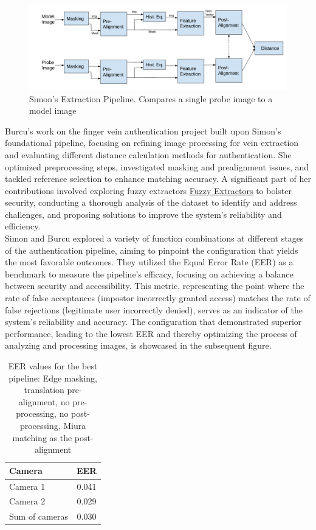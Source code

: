 \begin{figure}[!h]
    \centering
    \includegraphics[width=1\linewidth]{latex-img/pipeline_simon.png}
    \caption{Simon's Extraction Pipeline. Compares a single probe image to a model image}
    \label{pipeline_simon}
\end{figure}

Burcu's work on the finger vein authentication project built upon Simon's foundational pipeline, focusing on refining image processing for vein extraction and evaluating different distance calculation methods for authentication. She optimized preprocessing steps, investigated masking and prealignment issues, and tackled reference selection to enhance matching accuracy. A significant part of her contributions involved exploring fuzzy extractors \hyperref[def:Fuzzy_Extractors]{Fuzzy Extractors} to bolster security, conducting a thorough analysis of the dataset to identify and address challenges, and proposing solutions to improve the system's reliability and efficiency.\\

Simon and Burcu explored a variety of function combinations at different stages of the authentication pipeline, aiming to pinpoint the configuration that yields the most favorable outcomes. They utilized the Equal Error Rate (EER) as a benchmark to measure the pipeline's efficacy, focusing on achieving a balance between security and accessibility. This metric, representing the point where the rate of false acceptances (impostor incorrectly granted access) matches the rate of false rejections (legitimate user incorrectly denied), serves as an indicator of the system's reliability and accuracy. The configuration that demonstrated superior performance, leading to the lowest EER and thereby optimizing the process of analyzing and processing images, is showcased in the subsequent figure.

\begin{table}[H]
    \centering
    \caption{EER values for the best pipeline: Edge masking, translation pre-alignment, no pre-processing, no post-
    processing, Miura matching as the post-alignment}
    \begin{tabular}{lc}
    \toprule
    Camera & EER \\
    \midrule
    Camera 1 & 0.041 \\
    Camera 2 & 0.029 \\
    Sum of cameras & 0.030 \\
    \bottomrule
    \end{tabular}
    \label{tab:eervalues_best}
\end{table}

